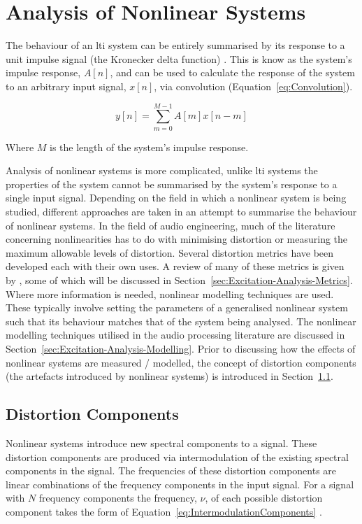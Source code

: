 \section{Analysis of Nonlinear Systems}
\label{sec:Excitation-AnalysisOfNonlinearSystems}
	The behaviour of an \acrshort{lti} system can be entirely summarised by its response to a unit impulse signal (the
	Kronecker delta function) \citep{phillips2007signals}. This is know as the system's impulse response, $A[n]$, and
	can be used to calculate the response of the system to an arbitrary input signal, $x[n]$, via convolution
	(Equation~\ref{eq:Convolution}).

	\begin{equation}
		y[n] = \sum_{m = 0}^{M - 1} A[m]x[n-m]
		\label{eq:Convolution}
	\end{equation}

	Where $M$ is the length of the system's impulse response.
	
	Analysis of nonlinear systems is more complicated, unlike \acrshort{lti} systems the properties of the system
	cannot be summarised by the system's response to a single input signal. Depending on the field in which a nonlinear
	system is being studied, different approaches are taken in an attempt to summarise the behaviour of nonlinear
	systems. In the field of audio engineering, much of the literature concerning nonlinearities has to do with
	minimising distortion or measuring the maximum allowable levels of distortion. Several distortion metrics have been
	developed each with their own uses. A review of many of these metrics is given by \citet{voishvillo2006assessment},
	some of which will be discussed in Section~\ref{sec:Excitation-Analysis-Metrics}.  Where more information is
	needed, nonlinear modelling techniques are used.  These typically involve setting the parameters of a generalised
	nonlinear system such that its behaviour matches that of the system being analysed. The nonlinear modelling
	techniques utilised in the audio processing literature are discussed in
	Section~\ref{sec:Excitation-Analysis-Modelling}. Prior to discussing how the effects of nonlinear systems are
	measured / modelled, the concept of distortion components (the artefacts introduced by nonlinear systems) is
	introduced in Section~\ref{sec:Excitation-Analysis-Components}.

	\subsection{Distortion Components}
	\label{sec:Excitation-Analysis-Components}
		Nonlinear systems introduce new spectral components to a signal. These distortion components are produced
		via intermodulation of the existing spectral components in the signal. The frequencies of these distortion
		components are linear combinations of the frequency components in the input signal. For a signal with $N$
		frequency components the frequency, $\nu$, of each possible distortion component takes the form of
		Equation~\ref{eq:IntermodulationComponents} \citep{hulick2005solid}.

